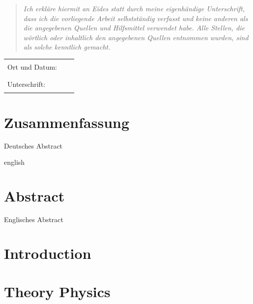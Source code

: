 \documentclass[12pt,oneside,bibtotoc,liststotoc]{scrbook}
\begin{document}
\begin{quote}
\emph{Ich erkläre hiermit an Eides statt durch meine eigenhändige Unterschrift, dass ich die vorliegende Arbeit selbstständig verfasst und keine anderen als die angegebenen Quellen und Hilfsmittel verwendet habe. Alle Stellen, die wörtlich oder inhaltlich den angegebenen Quellen entnommen wurden, sind als solche kenntlich gemacht.
}
\end{quote}
\vspace{2.5cm}

\begin{flushleft}
\begin{tabular}{lll}
Ort und Datum: & & \rule{7cm}{0.4pt}\\[7ex]
Unterschrift: & & \rule{7cm}{0.4pt}
\end{tabular}
\end{flushleft}

\thispagestyle{empty}

\renewcommand{\baselinestretch}{1.00}\normalsize

\tableofcontents
\setcounter{page}{1}
\listoffigures
\renewcommand{\baselinestretch}{1.5}\normalsize

\newpage
\setcounter{page}{1}

\chapter*{Zusammenfassung}
Deutsches Abstract

\begin{otherlanguage*}{english}
\chapter*{Abstract}
Englisches Abstract
\end{otherlanguage*}





\chapter{Introduction}



\chapter{Theory Physics}
\end{document}

